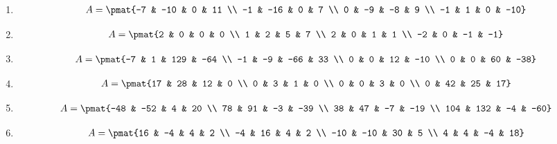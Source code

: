 \begin{enumerate}
\item

\begin{align*}
A = \pmat{-7 & -10 & 0 & 11 \\ -1 & -16 & 0 & 7 \\ 0 & -9 & -8 & 9 \\ -1 & 1 & 0 & -10}
\end{align*}

\item

\begin{align*}
A = \pmat{2 & 0 & 0 & 0 \\ 1 & 2 & 5 & 7 \\ 2 & 0 & 1 & 1 \\ -2 & 0 & -1 & -1}
\end{align*}

\item

\begin{align*}
A = \pmat{-7 & 1 & 129 & -64 \\ -1 & -9 & -66 & 33 \\ 0 & 0 & 12 & -10 \\ 0 & 0 & 60 & -38}
\end{align*}

\item

\begin{align*}
A = \pmat{17 & 28 & 12 & 0 \\ 0 & 3 & 1 & 0 \\ 0 & 0 & 3 & 0 \\ 0 & 42 & 25 & 17}
\end{align*}

\item

\begin{align*}
A = \pmat{-48 & -52 & 4 & 20 \\ 78 & 91 & -3 & -39 \\ 38 & 47 & -7 & -19 \\ 104 & 132 & -4 & -60}
\end{align*}

\item

\begin{align*}
A = \pmat{16 & -4 & 4 & 2 \\ -4 & 16 & 4 & 2 \\ -10 & -10 & 30 & 5 \\ 4 & 4 & -4 & 18}
\end{align*}


\end{enumerate}
